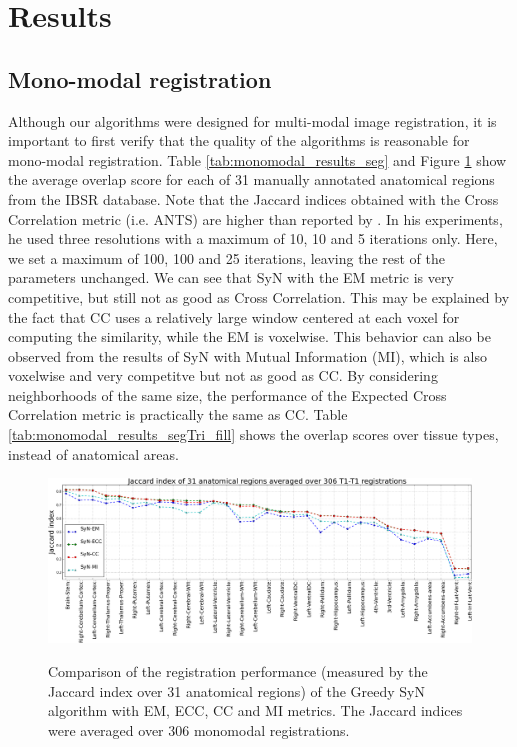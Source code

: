\section{Results}

\subsection{Mono-modal registration}
Although our algorithms were designed for multi-modal image registration, it is important to first verify that the quality of the algorithms is reasonable for mono-modal registration. Table \ref{tab:monomodal_results_seg} and Figure \ref{fig:mono_graph_seg} show the average overlap score for each of 31 manually annotated anatomical regions from the IBSR database. Note that the Jaccard indices obtained with the Cross Correlation metric (i.e. ANTS) are higher than reported by \cite{Rohlfing2012}. In his experiments, he used
three resolutions with a maximum of 10, 10 and 5 iterations only. Here, we set a maximum of 100, 100 and 25 iterations, leaving the rest of the parameters unchanged. We can see that SyN with the EM metric is very competitive, but still not as good as Cross Correlation. This may be explained by the fact that CC uses a relatively large
window centered at each voxel for computing the similarity, while the EM is voxelwise. This behavior can also be observed from the results of SyN with Mutual Information (MI), which is also voxelwise and very competitve but not as good as CC. By considering neighborhoods of the same size, the performance of the Expected Cross Correlation metric is practically the same as CC. Table \ref{tab:monomodal_results_segTri_fill} shows the overlap scores over tissue types, instead of anatomical areas.




\begin{figure}[H]
\centering
\includegraphics[width=1.0\linewidth]{./images/mono_lines_seg.png}\\
\caption{Comparison of the registration performance (measured by the Jaccard index over 31 anatomical regions) of the Greedy SyN algorithm with EM, ECC, CC and MI metrics. The Jaccard
indices were averaged over 306 monomodal registrations.}
\label{fig:mono_graph_seg}
\end{figure}

